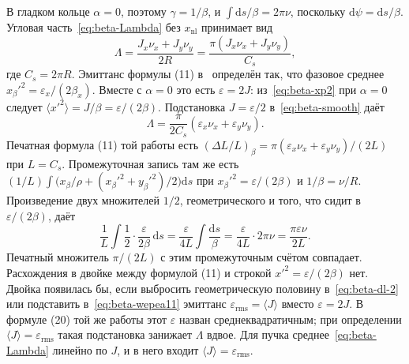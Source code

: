 \documentclass[aps,pra,preprint,a4paper,amsmath,amssymb,longbibliography]{revtex4-2}
\begin{document}
В гладком кольце $\alpha=0$, поэтому $\gamma=1/\beta$, и $\int\mathrm{d}s/\beta=2\pi\nu$, поскольку $\mathrm{d}\psi=\mathrm{d}s/\beta$. Угловая часть~\eqref{eq:beta-Lambda} без $x_{\mathrm{nl}}$ принимает вид
\begin{equation}
\label{eq:beta-smooth}
\Lambda
=\frac{J_x\nu_x+J_y\nu_y}{2R}
=\frac{\pi(J_x\nu_x+J_y\nu_y)}{C_s},
\end{equation}
где $C_s=2\pi R$. Эмиттанс формулы (11) в~\cite{Senichev2013} определён так, что фазовое среднее $x_\beta'^2=\varepsilon_x/(2\beta_x)$. Вместе с $\alpha=0$ это есть $\varepsilon=2J$: из~\eqref{eq:beta-xp2} при $\alpha=0$ следует $\langle x'^2\rangle=J/\beta=\varepsilon/(2\beta)$. Подстановка $J=\varepsilon/2$ в~\eqref{eq:beta-smooth} даёт
\begin{equation}
\label{eq:beta-wepea11}
\Lambda
=\frac{\pi}{2C_s}(\varepsilon_x\nu_x+\varepsilon_y\nu_y).
\end{equation}
Печатная формула (11) той работы есть $(\Delta L/L)_\beta=\pi(\varepsilon_x\nu_x+\varepsilon_y\nu_y)/(2L)$ при $L=C_s$. Промежуточная запись там же есть $(1/L)\int\bigl(x_\beta/\rho+(x_\beta'^2+y_\beta'^2)/2\bigr)\mathrm{d}s$ при $x_\beta'^2=\varepsilon/(2\beta)$ и $1/\beta=\nu/R$. Произведение двух множителей $1/2$, геометрического и того, что сидит в $\varepsilon/(2\beta)$, даёт
\begin{equation}
\label{eq:beta-wepea-alg}
\frac{1}{L}\int\frac{1}{2}\cdot\frac{\varepsilon}{2\beta}\,\mathrm{d}s
=\frac{\varepsilon}{4L}\int\frac{\mathrm{d}s}{\beta}
=\frac{\varepsilon}{4L}\cdot 2\pi\nu
=\frac{\pi\varepsilon\nu}{2L}.
\end{equation}
Печатный множитель $\pi/(2L)$ с этим промежуточным счётом совпадает. Расхождения в двойке между формулой (11) и строкой $x'^2=\varepsilon/(2\beta)$ нет. Двойка появилась бы, если выбросить геометрическую половину в~\eqref{eq:beta-dl-2} или подставить в~\eqref{eq:beta-wepea11} эмиттанс $\varepsilon_{\mathrm{rms}}=\langle J\rangle$ вместо $\varepsilon=2J$. В формуле (20) той же работы этот $\varepsilon$ назван среднеквадратичным; при определении $\langle J\rangle=\varepsilon_{\mathrm{rms}}$ такая подстановка занижает $\Lambda$ вдвое. Для пучка среднее~\eqref{eq:beta-Lambda} линейно по $J$, и в него входит $\langle J\rangle=\varepsilon_{\mathrm{rms}}$.
\end{document}
